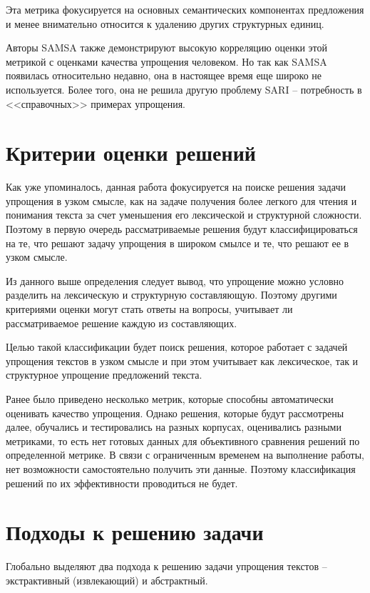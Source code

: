 Эта метрика фокусируется на основных семантических компонентах предложения и менее внимательно относится к удалению других структурных единиц.

Авторы SAMSA также демонстрируют высокую корреляцию оценки этой метрикой с оценками качества упрощения человеком. Но так как SAMSA появилась относительно недавно, она в настоящее время еще широко не используется. Более того, она не решила другую проблему SARI -- потребность в <<справочных>> примерах упрощения.


\section{Критерии оценки решений}

Как уже упоминалось, данная работа фокусируется на поиске решения задачи упрощения в узком смысле, как на задаче получения более легкого для чтения и понимания текста за счет уменьшения его лексической и структурной сложности\cite{martin_muss_2021}. Поэтому в первую очередь рассматриваемые решения будут классифицироваться на те, что решают задачу упрощения в широком смылсе и те, что решают ее в узком смысле.

Из данного выше определения следует вывод, что упрощение можно условно разделить на лексическую и структурную составляющую. Поэтому другими критериями оценки могут стать ответы на вопросы, учитывает ли рассматриваемое решение каждую из составляющих.

Целью такой классификации будет поиск решения, которое работает с задачей упрощения текстов в узком смысле и при этом учитывает как лексическое, так и структурное упрощение предложений текста.

Ранее было приведено несколько метрик, которые способны автоматически оценивать качество упрощения. Однако решения, которые будут рассмотрены далее, обучались и тестировались на разных корпусах, оценивались разными метриками, то есть нет готовых данных для объективного сравнения решений по определенной метрике. В связи с ограниченным временем на выполнение работы, нет возможности самостоятельно получить эти данные. Поэтому классификация решений по их эффективности проводиться не будет.


\section{Подходы к решению задачи}

Глобально выделяют два подхода к решению задачи упрощения текстов -- экстрактивный (извлекающий) и абстрактный.

